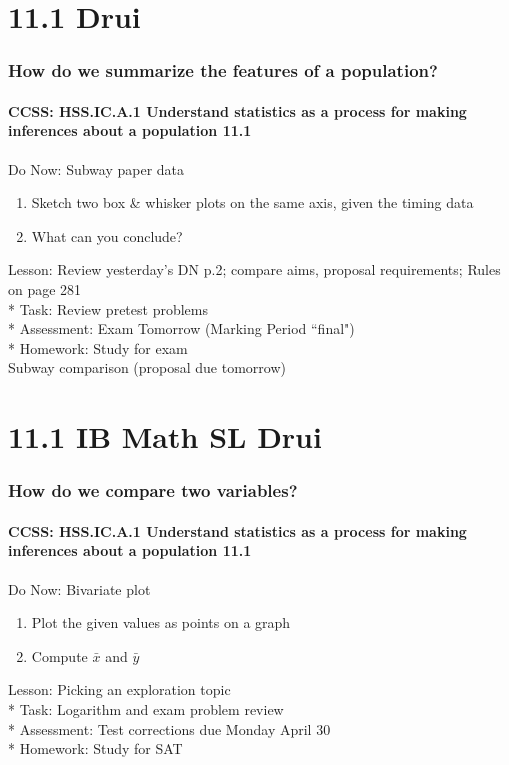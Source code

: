 \documentclass{beamer}
\begin{document}
  \section{11.1 Drui}
  \frame
  {
    \frametitle{How do we summarize the features of a population?}
    \framesubtitle{CCSS: HSS.IC.A.1 Understand statistics as a process for making inferences about a population \qquad \alert{11.1}}

    \begin{block}{Do Now: Subway paper data}
    \begin{enumerate}
        \item Sketch two box \& whisker plots on the same axis, given the timing data
        \item What can you conclude?
    \end{enumerate}
    \end{block}
    Lesson: Review yesterday's DN p.2; compare aims, proposal requirements; Rules on page 281\\*
    Task: Review pretest problems\\*
    Assessment: Exam Tomorrow (Marking Period ``final")\\*
    Homework: Study for exam\\
    Subway comparison (proposal due tomorrow)\\
  }

  \section{11.1 IB Math SL Drui}
  \frame
  {
    \frametitle{How do we compare two variables?}
    \framesubtitle{CCSS: HSS.IC.A.1 Understand statistics as a process for making inferences about a population \qquad \alert{11.1}}

    \begin{block}{Do Now: Bivariate plot}
    \begin{enumerate}
        \item Plot the given values as points on a graph
        \item Compute $\bar{x}$ and $\bar{y}$
    \end{enumerate}
    \end{block}
    Lesson: Picking an exploration topic\\*
    Task: Logarithm and exam problem review\\*
    Assessment: Test corrections due Monday April 30\\*
    Homework: Study for SAT\\
  }
\end{document}
